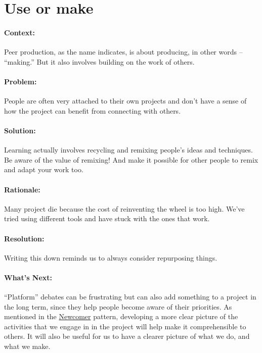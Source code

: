 \section{Use or make}
\paragraph{Context:}
Peer production, as the name indicates, is about producing, in other words --
``making.'' But it also involves building on the work of others.

\paragraph{Problem:}
People are often very attached to their own projects and don't have a sense of how the project can benefit from connecting with others.

\paragraph{Solution:} Learning actually involves recycling and remixing people's ideas and techniques. Be aware of the value of remixing!  And make it possible for other people to remix and adapt your work too.

\paragraph{Rationale:} 
Many project die because the cost of reinventing the wheel is too high.  We've tried using different tools and have stuck with the ones that work.

\paragraph{Resolution:} Writing this down reminds us to always consider repurposing things.

\paragraph{What's Next:} ``Platform'' debates can be frustrating but can
also add something to a project in the long term, since they help people
become aware of their priorities. As mentioned in
the \href{http://peeragogy.org/patterns/newcomer/}{Newcomer} pattern,
developing a more clear picture of the activities that we engage in in
the project will help make it comprehensible to others. It will also be
useful for us to have a clearer picture of what we do, and what we make.

